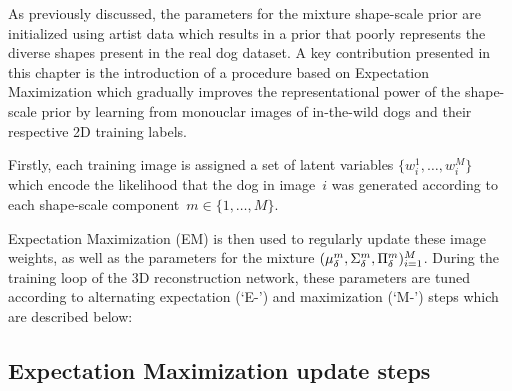 As previously discussed, the parameters for the mixture shape-scale prior are initialized using artist data which results in a prior that poorly represents the diverse shapes present in the real dog dataset. A key contribution presented in this chapter is the introduction of a procedure based on Expectation Maximization which gradually improves the representational power of the shape-scale prior by learning from monouclar images of in-the-wild dogs and their respective 2D training labels.


\def\imgweight#1#2{w_{#1}^{#2}}

Firstly, each training image is assigned a set of latent variables $\{\imgweight{i}{1}, \dots, \imgweight{i}{M}\}$ which encode the likelihood that the dog in image~$i$ was generated according to each shape-scale component~$m \in \{1,\dots,M\}$. 

Expectation Maximization (EM) is then used to regularly update these image weights, as well as the parameters for the mixture $(\mu_{\delta}^{m},\Sigma_{\delta}^{m},\Pi_{\delta}^{m})_{i=1}^{M}$. During the training loop of the 3D reconstruction network, these parameters are tuned according to alternating expectation (`E-') and maximization (`M-') steps which are described below:




\subsection{Expectation Maximization update steps}

